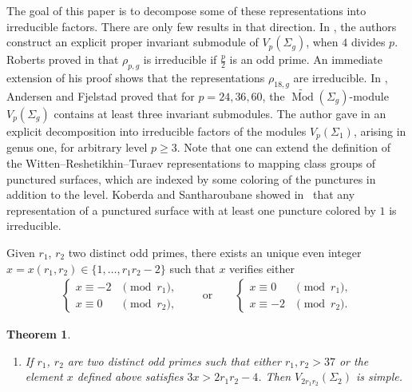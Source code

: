 \documentclass[11pt]{article}
\newcommand{\Mod}{\operatorname{Mod}}
\newcommand{\emcg}{\widetilde{\Mod}(\Sigma_g)}
\numberwithin{equation}{section}
\newtheorem{Theorem}{Theorem}[section]
\begin{document}
The goal of this paper is to decompose some of these representations into irreducible factors. There are only few results in that direction. In \cite{BHMV2}, the authors construct an explicit proper invariant submodule of $V_p(\Sigma_g)$, when $4$ divides $p$. Roberts proved in \cite{Ro} that $\rho_{p,g}$ is irreducible if $\frac{p}{2}$ is an odd prime. An immediate extension of his proof shows that the representations $\rho_{18,g}$ are irreducible. In \cite{AF}, Andersen and Fjelstad proved that for $p=24,36,60$, the $\emcg$-module $V_p(\Sigma_g)$ contains at least three invariant submodules. The author gave in \cite{Koju1} an explicit decomposition into irreducible factors of the modules $V_p(\Sigma_1)$, arising in genus one, for arbitrary level $p\geq 3$. Note that one can extend the definition of the Witten--Reshetikhin--Turaev representations to mapping class groups of punctured surfaces, which are indexed by some coloring of the punctures in addition to the level. Koberda and Santharoubane showed in~\cite{KoberdaSantharoubane17} that any representation of a punctured surface with at least one puncture colored by $1$ is irreducible.

Given $r_1$, $r_2$ two distinct odd primes, there exists an unique even integer $x=x(r_1,r_2)\in \{ 1, \ldots, r_1r_2-2\}$ such that $x$ verifies either
\begin{gather*} \begin{cases}
x\equiv -2 &\pmod{r_1}, \\
x\equiv 0 & \pmod{r_2},
\end{cases} \qquad \text{or}\qquad \begin{cases}
x\equiv 0 &\pmod{r_1}, \\
x\equiv -2 & \pmod{r_2}.
\end{cases}\end{gather*}

\setcounter{section}{1}
\setcounter{subsection}{0}
\setcounter{subsubsection}{0}
\setcounter{Theorem}{0}
\setcounter{equation}{0}
\begin{Theorem}\label{main_th}\quad
\begin{enumerate}\itemsep=0pt

\setcounter{section}{1}
\setcounter{subsection}{0}
\setcounter{subsubsection}{0}
\setcounter{Theorem}{1}
\setcounter{equation}{0}
\item[$4.$] If $r_1$, $r_2$ are two distinct odd primes such that either $r_1,r_2>37$ or the element $x$ defined above satisfies $3x>2r_1r_2-4$. Then $V_{2r_1r_2}(\Sigma_2)$ is simple.
\end{enumerate}
\end{Theorem}
\end{document}
